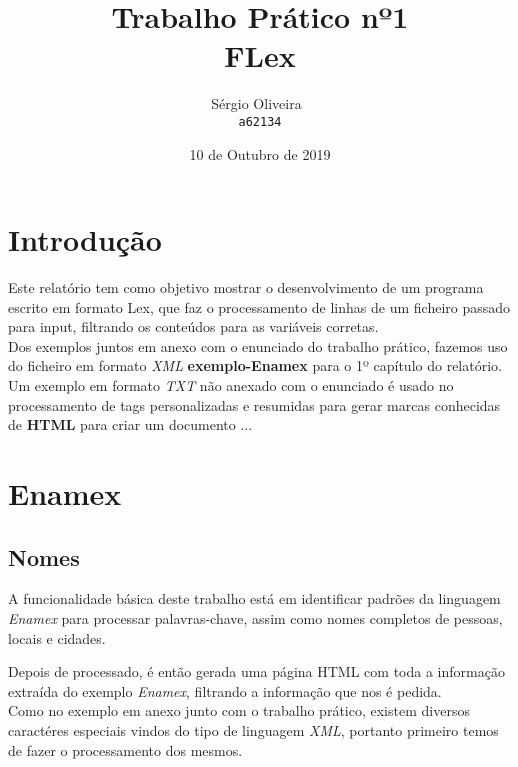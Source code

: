 \documentclass[11pt,a4paper]{report}
\begin{document}
\title{Trabalho Prático nº1 \\FLex}
\author{
   Sérgio Oliveira~\\
   \texttt{a62134}
   }
\date{10 de Outubro de 2019}
\maketitle
\raggedbottom
\pagebreak
\pagebreak


\tableofcontents
\pagebreak
\chapter{Introdução}

Este relatório tem como objetivo mostrar o desenvolvimento de um programa escrito em formato Lex, que faz o processamento de linhas de um ficheiro passado para input, filtrando os conteúdos para as variáveis corretas.
\\
Dos exemplos juntos em anexo com o enunciado do trabalho prático, fazemos uso do ficheiro em formato \textit{XML} \textbf{exemplo-Enamex} para o 1º capítulo do relatório. Um exemplo em formato \textit{TXT} não anexado com o enunciado é usado no processamento de tags personalizadas e resumidas para gerar marcas conhecidas de \textbf{HTML} para criar um documento ...

\raggedbottom
\pagebreak


\chapter{Enamex}
\section{Nomes}

A funcionalidade básica deste trabalho está em identificar padrões da linguagem \textit{Enamex} para processar palavras-chave, assim como nomes completos de pessoas, locais e cidades.

Depois de processado, é então gerada uma página HTML com toda a informação extraída do exemplo \textit{Enamex}, filtrando a informação que nos é pedida.
~\\
Como no exemplo em anexo junto com o trabalho prático, existem diversos caractéres especiais vindos do tipo de linguagem \textit{XML}, portanto primeiro temos de fazer o processamento dos mesmos.
\end{document}
